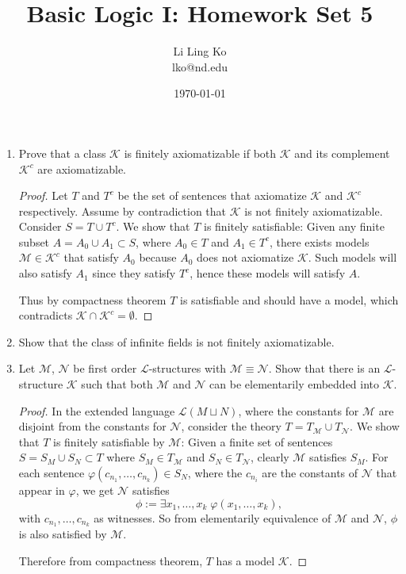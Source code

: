 \documentclass{article}
\begin{document}
\title{Basic Logic I: Homework Set 5}
\author{Li Ling Ko\\ lko@nd.edu}
\date{\today}
\maketitle

\begin{enumerate}
  \item Prove that a class $\mathcal{K}$ is finitely axiomatizable if both
    $\mathcal{K}$ and its complement $\mathcal{K}^c$ are axiomatizable.
    \begin{proof}
      Let $T$ and $T^c$ be the set of sentences that axiomatize
      $\mathcal{K}$ and $\mathcal{K}^c$ respectively. Assume by
      contradiction that $\mathcal{K}$ is not finitely axiomatizable.
      Consider $S=T\cup T^c$. We show that $T$ is finitely satisfiable:
      Given any finite subset $A=A_0\cup A_1\subset S$, where $A_0\in T$ and
      $A_1\in T^c$, there exists models $\mathcal{M}\in\mathcal{K}^c$ that
      satisfy $A_0$ because $A_0$ does not axiomatize $\mathcal{K}$. Such
      models will also satisfy $A_1$ since they satisfy $T^c$, hence these
      models will satisfy $A$.

      Thus by compactness theorem $T$ is satisfiable and should have a
      model, which contradicts $\mathcal{K}\cap\mathcal{K}^c=\emptyset$.
    \end{proof}

  \item Show that the class of infinite fields is not finitely
    axiomatizable.

  \item Let $\mathcal{M}$, $\mathcal{N}$ be first order
  $\mathcal{L}$-structures with $\mathcal{M}\equiv\mathcal{N}$. Show that
  there is an $\mathcal{L}$-structure $\mathcal{K}$ such that both
  $\mathcal{M}$ and $\mathcal{N}$ can be elementarily embedded into
  $\mathcal{K}$. 

  \begin{proof}
    In the extended language $\mathcal{L}(M\sqcup N)$, where the constants
    for $\mathcal{M}$ are disjoint from the constants for $\mathcal{N}$,
    consider the theory $T=T_\mathcal{M}\cup T_\mathcal{N}$. We show that
    $T$ is finitely satisfiable by $\mathcal{M}$: Given a finite set of
    sentences $S=S_M\cup S_N\subset T$ where $S_M\in T_\mathcal{M}$ and
    $S_N\in T_\mathcal{N}$, clearly $\mathcal{M}$ satisfies $S_M$. For each
    sentence $\varphi(c_{n_1},\ldots,c_{n_k})\in S_N$, where the $c_{n_i}$
    are the constants of $\mathcal{N}$ that appear in $\varphi$, we get
    $\mathcal{N}$ satisfies
    \begin{equation*}
      \phi := \exists x_1,\ldots,x_k\; \varphi(x_1,\ldots,x_k),
    \end{equation*}
    with $c_{n_1},\ldots,c_{n_k}$ as witnesses. So from elementarily
    equivalence of $\mathcal{M}$ and $\mathcal{N}$, $\phi$ is also
    satisfied by $\mathcal{M}$.

    Therefore from compactness theorem, $T$ has a model $\mathcal{K}$.
  \end{proof}
\end{enumerate}
\end{document}
